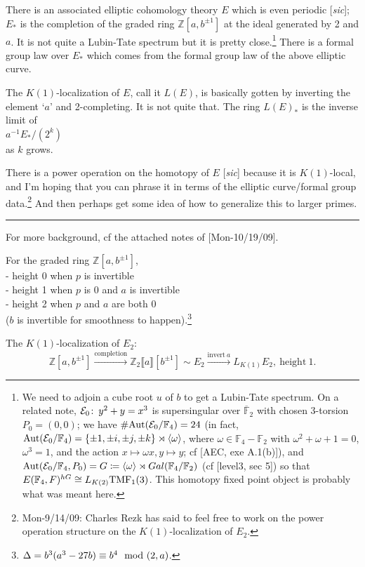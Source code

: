 \documentclass{rs}
\theoremstyle{definition}
\theoremstyle{remark}
\def\co{\colon\thinspace}
\newcommand{\mb}[1]{\mathbb{#1}}
\newcommand{\Aut}{{\rm Aut}}
\newcommand{\cF}{\overline {\mb F}}
\newcommand{\CE}{{\cal E}}
\newcommand{\BF}{{\mb F}}
\newcommand{\BZ}{{\mb Z}}
\newcommand{\md}{~~{\rm mod}~}
\newcommand{\TMF}{{\rm TMF}}
\newcommand{\ce}{\coloneqq}
\renewcommand{\=}{\approx}
\renewcommand{\-}{\sim}
\numberwithin{equation}{section}
\numberwithin{thm}{section}
\begin{document}
There is an associated elliptic cohomology theory $E$ which is even
periodic [{\em sic}]; $E_*$ is the completion of the graded ring $\BZ[a,b^{\pm1}]$ at the
ideal generated by 2 and $a$.  It is not quite a Lubin-Tate spectrum but
it is pretty close.\footnote{We need to adjoin a cube root $u$ of $b$ to get a Lubin-Tate spectrum.  
On a related note, $\CE_0 \co y^2 + y = x^3$ is supersingular over $\cF_2$ with chosen 3-torsion $P_0 = (0,0)$; 
we have $\#\Aut(\CE_0/\BF_4) = 24$ 
(in fact, $\Aut(\CE_0/\BF_4) = \{ \pm 1, \pm i, \pm j, \pm k \} \rtimes \langle \omega \rangle$, 
where $\omega \in \BF_4 - \BF_2$ with $\omega^2 + \omega + 1 = 0$, $\omega^3 = 1$, and the action $x \mapsto \omega x, y \mapsto y$; cf [AEC, exe A.1(b)]), 
and $\Aut(\CE_0/\BF_4, P_0) = G \ce \langle \omega \rangle \rtimes Gal(\BF_4/\BF_2)$ (cf [level3, sec 5]) 
so that $E(\BF_4,F)^{hG} \cong L_{K(2)} \TMF_1(3)$.   This homotopy fixed point object is probably what was meant here.  }  There is a formal group law over $E_*$ which comes
from the formal group law of the above elliptic curve.

The $K(1)$-localization of $E$, call it $L(E)$, is basically gotten by
inverting the element `$a$' and 2-completing.  It is not quite that.
The ring $L(E)_*$ is the inverse limit of
\\$a^{-1}E_*/(2^k)$
\\as $k$ grows.

There is a power operation on the homotopy of $E$ [{\em sic}] because it is
$K(1)$-local, and I'm hoping that you can phrase it in terms of the
elliptic curve/formal group data.\footnote{Mon-9/14/09: Charles Rezk has said to feel free to work on the power operation structure on the $K(1)$-localization of $E_2$.  }  And then perhaps get some idea of
how to generalize this to larger primes.\\

\hrule

For more background, cf the attached notes of [Mon-10/19/09].  

For the graded ring $\BZ[a,b^{\pm1}]$, \\
- height 0 when $p$ is invertible \\
- height 1 when $p$ is 0 and $a$ is invertible \\
- height 2 when $p$ and $a$ are both 0 \\
($b$ is invertible for smoothness to happen).\footnote{$\Delta = b^3 (a^3 - 27 b) \equiv b^4 \md (2,a)$.  }  

The $K(1)$-localization of $E_2$: 
\[
 \BZ[a,b^{\pm1}] \xrightarrow{\text{completion}} \BZ_2 \llbracket a \rrbracket [b^{\pm1}] 
 \sim E_2 \xrightarrow{\text{invert}~a} L_{K(1)}E_2, ~\text{height}~ 1.  
\]
\end{document}
